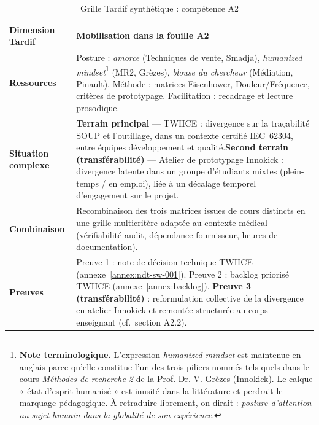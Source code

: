 \begin{table}[h!]
  \centering\small
  \caption{Grille Tardif synthétique : compétence A2}
  \label{tab:grille-tardif-a2}
  \begin{tabularx}{\textwidth}{@{} >{\bfseries}p{3.2cm} X @{}}
    \toprule
    Dimension Tardif & Mobilisation dans la fouille A2 \\
    \midrule
    Ressources & Posture : \emph{amorce} (Techniques de vente, Smadja), \emph{humanized mindset}\footnote{\textbf{Note terminologique.} L'expression \textit{humanized mindset} est maintenue en anglais parce qu'elle constitue l'un des trois piliers nommés tels quels dans le cours \textit{Méthodes de recherche 2} de la Prof. Dr. V. Grèzes (Innokick). Le calque « état d'esprit humanisé » est inusité dans la littérature et perdrait le marquage pédagogique. À retraduire librement, on dirait : \emph{posture d'attention au sujet humain dans la globalité de son expérience}.\label{fn:humanized-mindset}} (MR2, Grèzes), \emph{blouse du chercheur} (Médiation, Pinault). Méthode : matrices Eisenhower, Douleur/Fréquence, critères de prototypage. Facilitation : recadrage et lecture prosodique. \\
    \midrule
    Situation complexe & \textbf{Terrain principal} --- TWIICE : divergence sur la traçabilité SOUP et l'outillage, dans un contexte certifié IEC~62304, entre équipes développement et qualité.\newline \textbf{Second terrain (transférabilité)} --- Atelier de prototypage Innokick : divergence latente dans un groupe d'étudiants mixtes (plein-temps / en emploi), liée à un décalage temporel d'engagement sur le projet. \\
    \midrule
    Combinaison & Recombinaison des trois matrices issues de cours distincts en une grille multicritère adaptée au contexte médical (vérifiabilité audit, dépendance fournisseur, heures de documentation). \\
    \midrule
    Preuves & Preuve 1 : note de décision technique TWIICE (annexe~\ref{annex:ndt-sw-001}). Preuve 2 : backlog priorisé TWIICE (annexe~\ref{annex:backlog}). \textbf{Preuve 3 (transférabilité)} : reformulation collective de la divergence en atelier Innokick et remontée structurée au corps enseignant (cf.~section A2.2). \\
    \bottomrule
  \end{tabularx}
\end{table}

\bigskip

